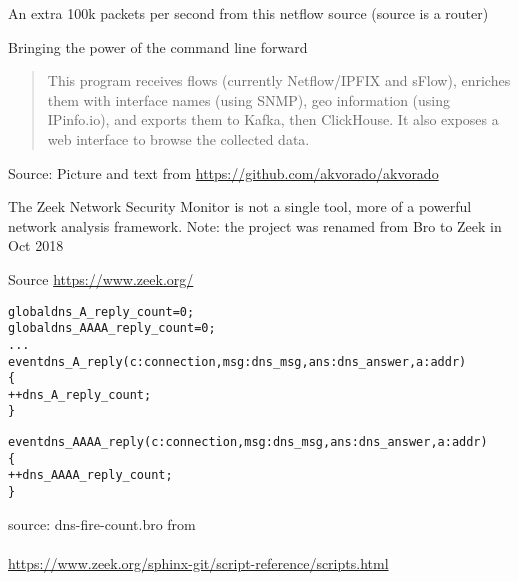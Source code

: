 \documentclass[Screen16to9,17pt]{foils}
\begin{document}


\centerline{An extra 100k packets per second from this netflow source (source is a router)}



\centerline{Bringing the power of the command line forward}




\begin{quote}
This program receives flows (currently Netflow/IPFIX and sFlow), enriches them with interface names (using SNMP), geo information (using IPinfo.io), and exports them to Kafka, then ClickHouse. It also exposes a web interface to browse the collected data.
\end{quote}
Source: Picture and text from \url{https://github.com/akvorado/akvorado}






The Zeek Network Security Monitor is not a single tool, more of a
powerful network analysis framework. Note: the project was renamed from Bro to Zeek in Oct 2018

{\small Source \url{https://www.zeek.org/}}


\begin{alltt}\small
global dns_A_reply_count=0;
global dns_AAAA_reply_count=0;
...
event dns_A_reply(c: connection, msg: dns_msg, ans: dns_answer, a: addr)
        \{
        ++dns_A_reply_count;
        \}

event dns_AAAA_reply(c: connection, msg: dns_msg, ans: dns_answer, a: addr)
        \{
        ++dns_AAAA_reply_count;
        \}
\end{alltt}

source: dns-fire-count.bro from\\
{\small {}\\
\url{https://www.zeek.org/sphinx-git/script-reference/scripts.html}}
\end{document}
